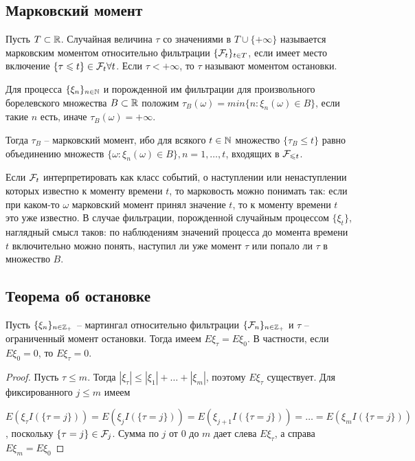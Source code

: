 \subsection{Марковский момент}

\begin{definition}
Пусть $T \subset \mathbb{R}$. Случайная величина $\tau$ со значениями в $T \cup \{+ \infty\}$ называется марковским моментом относительно фильтрации $\{\mathcal{F}_t\}_{t \in T}$, если имеет место включение $\{\tau \leqslant t\} \in \mathcal{F}_t \forall t$. Если $\tau < +\infty$, то $\tau$ называют моментом остановки.
\end{definition}

\begin{example}
Для процесса $\{\xi_n\}_{n \in \mathbb{N}}$ и порожденной им фильтрации для произвольного борелевского множества $B \subset \mathbb{R}$ положим $\tau_B(\omega) = min\{n: \xi_n(\omega) \in B\}$, если такие $n$ есть, иначе $\tau_B(\omega) = +\infty$.

Тогда $\tau_B$ -- марковский момент, ибо для всякого $t \in \mathbb{N}$ множество $\{\tau_B \leq t\}$ равно объединению множеств $\{\omega : \xi_n(\omega) \in B\}, n = 1, \dots, t$, входящих в $\mathcal{F}_{\leqslant t}$.
\end{example}

Если $\mathcal{F}_t$ интерпретировать как класс событий, о наступлении или ненаступлении которых известно к моменту времени $t$, то марковость можно понимать так: если при каком-то $\omega$ марковский момент принял значение $t$, то к моменту времени $t$ это уже известно. В случае фильтрации, порожденной случайным процессом $\{\xi_t\}$, наглядный смысл таков: по наблюдениям значений процесса до момента времени $t$ включительно можно понять, наступил ли уже момент $\tau$ или попало ли $\tau$ в множество $B$.

\subsection{Теорема об остановке}

\begin{theorem}[об остановке]
Пусть $\{\xi_n\}_{n \in \mathbb{Z}_+}$ -- мартингал относительно фильтрации $\{\mathcal{F}_n\}_{n \in \mathbb{Z}_+}$ и $\tau$ -- ограниченный момент остановки. Тогда имеем $E \xi_{\tau} = E \xi_0$. В частности, если $E \xi_0 = 0$, то $E \xi_{\tau} = 0$.
\end{theorem}

\begin{proof}
Пусть $\tau \leq m$. Тогда $|\xi_{\tau}| \leq |\xi_1| + \dots + |\xi_m|$, поэтому $E \xi_{\tau}$ существует. Для фиксированного $j \leq m$ имеем

$$E(\xi_{\tau}I(\{\tau = j\})) = E(\xi_{j}I(\{\tau = j\})) = E(\xi_{j + 1}I(\{\tau = j\})) = \dots = E(\xi_{m}I(\{\tau = j\}))$$, поскольку $\{\tau = j\} \in \mathcal{F}_{j}$. Сумма по $j$ от $0$ до $m$ дает слева $E \xi_{\tau}$, а справа $E \xi_m = E \xi_0$
\end{proof}

